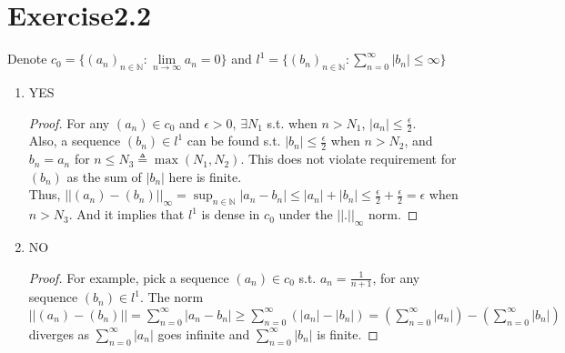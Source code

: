 \documentclass[paper=a4, fontsize=11pt]{scrartcl} %
\numberwithin{equation}{section} %
\numberwithin{figure}{section} %
\numberwithin{table}{section} %
\begin{document}
\section{Exercise2.2}
	Denote $c_0 = \{(a_n)_{n\in\mathbb{N}}: \lim\limits_{n \rightarrow \infty} a_n = 0\}$ and $l^1 = \{(b_n)_{n\in\mathbb{N}}: \sum_{n=0}^{\infty} |b_n| \le \infty\}$
	\begin{enumerate}
		\item
		YES
		\begin{proof}
			For any $(a_n) \in c_0$ and $\epsilon > 0$, $\exists N_1$ s.t. when $n > N_1$, $|a_n| \le \frac{\epsilon}{2}$.\\
			Also, a sequence $(b_n) \in l^1$ can be found s.t. $|b_n| \le \frac{\epsilon}{2}$ when $n > N_2$, and $b_n = a_n$ for $n \leq N_3 \triangleq \max(N_1, N_2)$. This does not violate requirement for $(b_n)$ as the sum of $|b_n|$ here is finite.\\
			Thus, $||(a_n) - (b_n)||_\infty = \sup_{n \in \mathbb{N}} |a_n - b_n| \leq |a_n| + |b_n| \leq \frac{\epsilon}{2} + \frac{\epsilon}{2} = \epsilon$ when $n > N_3$. And it implies that $l^1$ is dense in $c_0$ under the $||.||_\infty$ norm.
		\end{proof}
		\item 
		NO
		\begin{proof}
			For example, pick a sequence $(a_n) \in c_0$ s.t. $a_n = \frac{1}{n+1}$, for any sequence $(b_n) \in l^1$. The norm $||(a_n) - (b_n)|| = \sum_{n=0}^{\infty} |a_n - b_n| \geq \sum_{n=0}^{\infty} (|a_n| - |b_n|) = (\sum_{n=0}^{\infty}|a_n|) - (\sum_{n=0}^{\infty}|b_n|)$ diverges as $\sum_{n=0}^{\infty}|a_n|$ goes infinite and $\sum_{n=0}^{\infty}|b_n|$ is finite.
		\end{proof}
	
	\end{enumerate}
\end{document}
